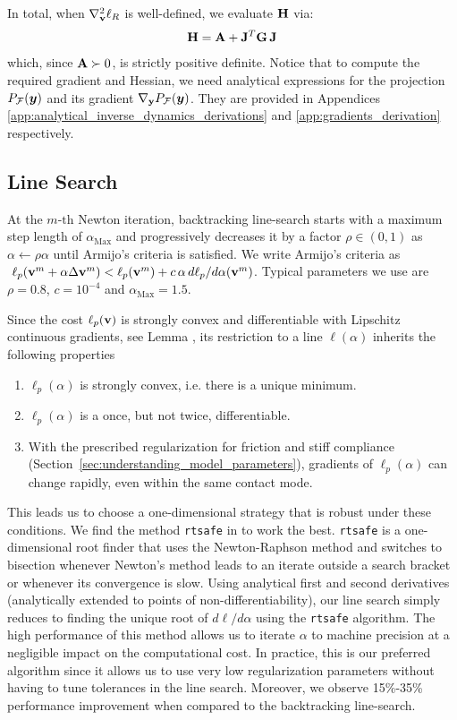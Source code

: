 In total, when $\nabla_{\mathbf{v}}^2\ell_R$ is well-defined,
we evaluate ${\mathbf{H}}$ via: 
\begin{equation}
	\mf{H} = \mf{A} + \mf{J}^T\mf{G}\,\mf{J}
	\label{eq:ell_hessian}
\end{equation}
which, since ${\mathbf{A}}\succ 0$, is strictly positive definite. Notice
that to compute the required gradient and Hessian, we need analytical expressions
for the projection $P_\mathcal{F}({\bm{y}})$ and its gradient
$\nabla_{\mathbf{y}}P_\mathcal{F}({\bm{y}})$. They are provided in Appendices
\ref{app:analytical_inverse_dynamics_derivations} and
\ref{app:gradients_derivation} respectively.

\subsection{Line Search}

At the $m\text{-th}$ Newton iteration, backtracking line-search starts with a
maximum step length of $\alpha_\text{Max}$ and progressively decreases it
by a factor $\rho \in (0, 1)$ as $\alpha\gets\rho\alpha$ until Armijo's
criteria \cite[\S 3.1]{bib:nocedal2006numerical} is satisfied. We write Armijo's
criteria as $~\ell_p({\mathbf{v}}^m + \alpha \Delta{\mathbf{v}}^{m}) < \ell_p({\mathbf{v}}^m) +
c\,\alpha\,d\ell_p/d\alpha({\mathbf{v}}^m)$. Typical parameters we use are
$\rho=0.8$, $c=10^{-4}$ and $\alpha_\text{Max}=1.5$.

Since the cost $\ell_p({\mathbf{v}})$ is strongly convex and differentiable with
Lipschitz continuous gradients, see Lemma , its restriction to a line $\ell(\alpha)$ inherits the following
properties
\begin{enumerate}
	\item $\ell_p(\alpha)$ is strongly convex, i.e. there is a unique minimum.
	\item $\ell_p(\alpha)$ is a once, but not twice, differentiable. 
      \item With the prescribed regularization for friction 
        and stiff compliance (Section~\ref{sec:understanding_model_parameters}),
	gradients of $\ell_p(\alpha)$ can change rapidly, even within 
        the same contact mode.
\end{enumerate}

This leads us to choose a one-dimensional strategy that is robust under these
conditions. We find the method \verb;rtsafe; in \cite[\S
9.4]{bib:numerical_recipes} to work the best. \verb;rtsafe; is a one-dimensional
root finder that uses the Newton-Raphson method and switches to bisection
whenever Newton's method leads to an iterate outside a search bracket or
whenever its convergence is slow. Using analytical first and second derivatives
(analytically extended to points of non-differentiability),
our line search simply reduces to finding the unique root of $d\ell/d\alpha$
using the \verb;rtsafe; algorithm. The high performance of this method allows us 
to iterate $\alpha$ to machine precision at a negligible impact on the
computational cost. In practice, this is our preferred algorithm since it allows
us to use very low regularization parameters without having to tune tolerances
in the line search. Moreover, we observe 15\%-35\% performance improvement when
compared to the backtracking line-search.

